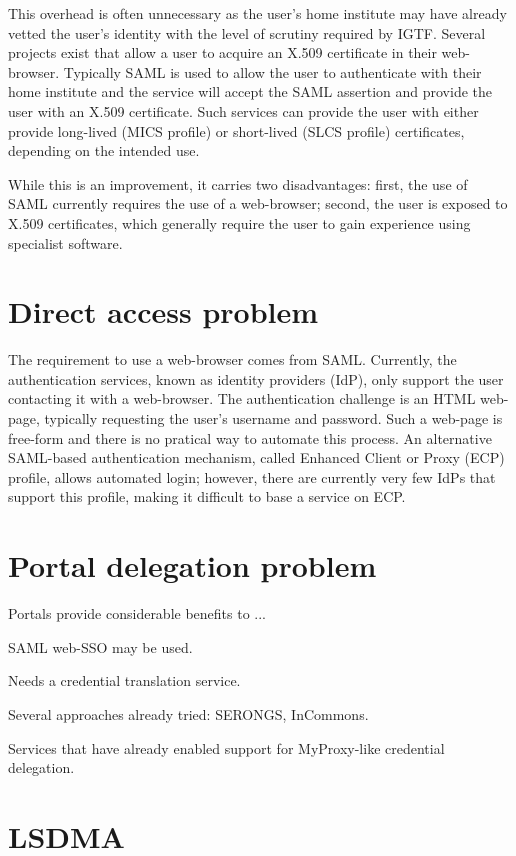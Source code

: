 \documentclass[a4paper]{jpconf}
\begin{document}
This overhead is often unnecessary as the user's home institute may
have already vetted the user's identity with the level of scrutiny
required by IGTF.  Several projects exist that allow a user to acquire
an X.509 certificate in their web-browser.  Typically SAML is used to
allow the user to authenticate with their home institute and the
service will accept the SAML assertion and provide the user with an
X.509 certificate.  Such services can provide the user with either
provide long-lived (MICS profile) or short-lived (SLCS profile)
certificates, depending on the intended use.

While this is an improvement, it carries two disadvantages: first, the
use of SAML currently requires the use of a web-browser; second, the
user is exposed to X.509 certificates, which generally require the
user to gain experience using specialist software.

\section{Direct access problem}

The requirement to use a web-browser comes from SAML.  Currently, the
authentication services, known as identity providers (IdP), only
support the user contacting it with a web-browser.  The authentication
challenge is an HTML web-page, typically requesting the user's
username and password.  Such a web-page is free-form and there is no
pratical way to automate this process.  An alternative SAML-based
authentication mechanism, called Enhanced Client or Proxy (ECP)
profile, allows automated login; however, there are currently very few
IdPs that support this profile, making it difficult to base a service
on ECP.

\section{Portal delegation problem}

Portals provide considerable benefits to ...

SAML web-SSO may be used.

Needs a credential translation service.

Several approaches already tried: SERONGS, InCommons.

Services that have already enabled support for MyProxy-like credential
delegation.

\section{LSDMA}
\end{document}
